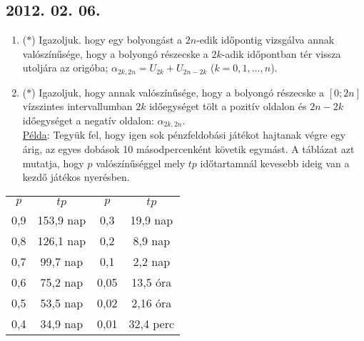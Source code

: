 \documentclass{article}
\begin{document}
\subsection*{2012. 02. 06.}
\begin{enumerate}
\item ($*$)
Igazoljuk. hogy egy bolyongást a $2n$-edik időpontig vizsgálva annak valószínűsége, hogy a bolyongó részecske a $2k$-adik időpontban tér vissza utoljára az origóba;
$\alpha_{2k,2n}=U_{2k}+U_{2n-2k}$ ($k=0,1,\ldots,n$).
\item ($*$)
Igazoljuk, hogy annak valószínűsége, hogy a bolyongó részecske a $[0;2n]$ vízszintes intervallumban $2k$ időegységet tölt a pozitív oldalon és $2n-2k$ időegységet a negatív oldalon: $\alpha_{2k,2n}$.\\
\underline{Példa}: Tegyük fel, hogy igen sok pénzfeldobási játékot hajtanak végre egy árig, az egyes dobások 10 másodpercenként követik egymást. A táblázat azt mutatja, hogy $p$ valószínűséggel mely $tp$ időtartamnál kevesebb ideig van a kezdő játékos nyerésben.
\end{enumerate}
\begin{center}
\begin{tabular}{ c c | c c}
 $p$ & $tp$ & $p$ & $tp$ \\
 0,9 & 153,9 nap & 0,3 & 19,9 nap \\
 0,8 & 126,1 nap & 0,2 & 8,9 nap \\
 0,7 & 99,7 nap & 0,1 & 2,2 nap \\
 0,6 & 75,2 nap & 0,05 & 13,5 óra \\
 0,5 & 53,5 nap & 0,02 & 2,16 óra \\
 0,4 & 34,9 nap & 0,01 & 32,4 perc \\
\end{tabular}
\end{center}
\end{document}
